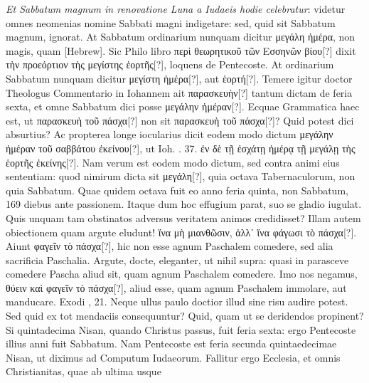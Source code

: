 \textit{Et Sabbatum magnum in renovatione Luna a Iudaeis
hodie celebratur}: videtur omnes neomenias nomine Sabbati
magni indigetare: sed, quid sit Sabbatum magnum, ignorat.
At
Sabbatum ordinarium nunquam dicitur \textgreek{μεγάλη ἡμέρα},
 non magis,
quam \texthebrew{[Hebrew]}.
Sic Philo libro \textgreek{περὶ θεωρητικοῦ τῶν Εσσηνῶν βίου[?]}
 dixit \textgreek{τὴν
προεόρτιον τὴς μεγίστης ἑορτῆς[?]}, loquens de Pentecoste.
At ordinarium
Sabbatum nunquam dicitur \textgreek{μεγίστη ἡμέρα[?]},
 aut \textgreek{ἑορτή[?]}.
Temere igitur
doctor Theologus Commentario in Iohannem ait \textgreek{παρασκευὴν[?]}
tantum dictam de feria sexta, et omne Sabbatum dici posse
 \textgreek{μεγάλην
ἡμέραν[?]}.
Ecquae Grammatica haec est, ut \textgreek{παρασκευὴ τοῦ πάσχα[?]}
non sit \textgreek{παρασκευὴ τοῦ πάσχα[?]}?
Quid potest dici absurtius?
Ac propterea
longe iocularius dicit eodem modo dictum \textgreek{μεγάλην ἡμέραν
τοῦ σαββάτου ἐκείνου[?]},
ut Ioh. . 37. \textgreek{ἐν δὲ τῇ ἐσχάτῃ ἡμέρᾳ τῇ μεγάλῃ
τὴς ἑορτῆς ἐκείνης[?]}.
Nam verum est eodem modo dictum, sed
contra animi eius sententiam: quod nimirum dicta sit \textgreek{μεγάλη[?]},
quia octava Tabernaculorum, non quia Sabbatum.
Quae quidem
octava fuit eo anno feria quinta, non Sabbatum, 169 diebus ante
passionem.
Itaque dum hoc effugium parat, suo se gladio iugulat.
Quis unquam tam obstinatos adversus veritatem animos credidisset?
Illam autem obiectionem quam argute eludunt!
 \textgreek{ἵνα μὴ μιανθῶσιν,
ἀλλ᾽ ἵνα φάγωσι τὸ πάσχα[?]}.
Aiunt \textgreek{φαγεῖν τὸ πάσχα[?]}, hic non esse
agnum Paschalem comedere, sed alia sacrificia Paschalia.
Argute, docte, eleganter, ut nihil supra: quasi in parasceve comedere
Pascha aliud sit, quam agnum Paschalem comedere.
Imo nos
negamus, \textgreek{θύειν καὶ φαγεῖν τὸ πάσχα[?]},
 aliud esse, quam agnum Paschalem
immolare, aut manducare.
Exodi , 21.
Neque ullus paulo doctior illud sine risu audire potest.
Sed quid ex tot mendaciis consequuntur?
Quid, quam ut se deridendos propinent?
Si quintadecima Nisan, quando Christus passus, fuit feria sexta:
 ergo Pentecoste
illius anni fuit Sabbatum.
Nam Pentecoste est feria secunda
quintaedecimae Nisan, ut diximus ad Computum Iudaeorum.
Fallitur ergo Ecclesia, et omnis Christianitas, quae ab ultima usque
